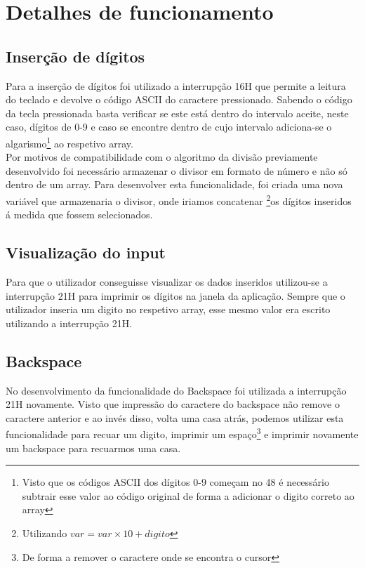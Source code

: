 \section{Detalhes de funcionamento}
\subsection{Inserção de dígitos}
Para a inserção de dígitos foi utilizado a interrupção 16H que permite a leitura do teclado e devolve o código ASCII do caractere pressionado. Sabendo o código da tecla pressionada basta verificar se este está dentro do intervalo aceite, neste caso, dígitos de 0-9 e caso se encontre dentro de cujo intervalo adiciona-se o algarismo\footnote{Visto que os códigos ASCII dos dígitos 0-9 começam no 48 é necessário subtrair esse valor ao código original de forma a adicionar o digito correto ao array} ao respetivo array.  \\

Por motivos de compatibilidade com o algoritmo da divisão previamente desenvolvido foi necessário armazenar o divisor em formato de número e não só dentro de um array. Para desenvolver esta funcionalidade, foi criada uma nova variável que armazenaria o divisor, onde iriamos concatenar \footnote{Utilizando $var = var\times 10 + digito$}os dígitos inseridos á medida que fossem selecionados.

\subsection{Visualização do input}
Para que o utilizador conseguisse visualizar os dados inseridos utilizou-se a interrupção 21H para imprimir os dígitos na janela da aplicação. Sempre que o utilizador inseria um digito no respetivo array, esse mesmo valor era escrito utilizando a interrupção 21H.

\subsection{Backspace}
No desenvolvimento da funcionalidade do Backspace foi utilizada a interrupção 21H novamente. Visto que impressão do caractere do backspace não remove o caractere anterior e ao invés disso, volta uma casa atrás, podemos utilizar esta funcionalidade para recuar um digito, imprimir um espaço\footnote{De forma a remover o caractere onde se encontra o cursor} e imprimir novamente um backspace para recuarmos uma casa.\\

